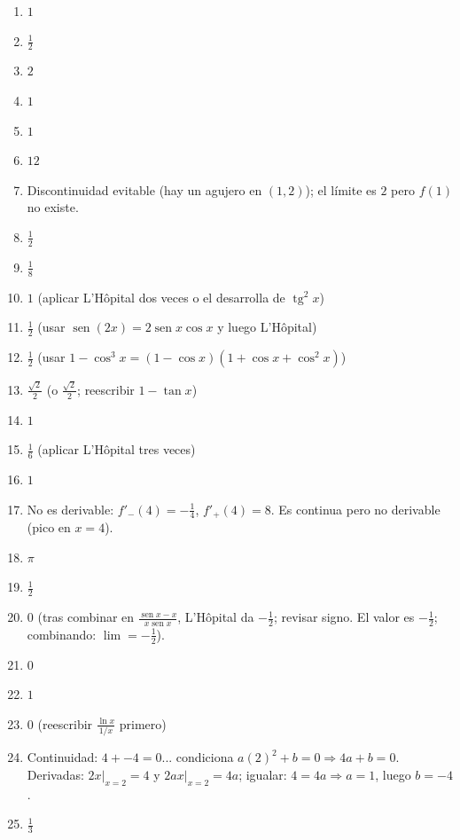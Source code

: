 \documentclass[12pt, letterpaper]{article}
\begin{document}
  \begin{enumerate}[leftmargin=*, label=\textbf{\arabic*.}]
    \item $1$
    \item $\frac{1}{2}$
    \item $2$
    \item $1$
    \item $1$
    \item $12$
    \item Discontinuidad evitable (hay un agujero en $(1,2)$); el límite es $2$ pero $f(1)$ no existe.
    \item $\frac{1}{2}$
    \item $\frac{1}{8}$
    \item $1$ (aplicar L'Hôpital dos veces o el desarrolla de $\operatorname{tg}^2 x$)
    \item $\frac{1}{2}$ (usar $\operatorname{sen}(2x) = 2\operatorname{sen}x\cos x$ y luego L'Hôpital)
    \item $\frac{1}{2}$ (usar $1-\cos^3 x = (1-\cos x)(1+\cos x+\cos^2 x)$)
    \item $\frac{\sqrt{2}}{2}$ (o $\frac{\sqrt{2}}{2}$; reescribir $1-\tan x$)
    \item $1$
    \item $\frac{1}{6}$ (aplicar L'Hôpital tres veces)
    \item $1$
    \item No es derivable: $f'_-(4) = -\frac{1}{4}$, $f'_+(4) = 8$. Es continua pero no derivable (pico en $x=4$).
    \item $\pi$ \checkmark
    \item $\frac{1}{2}$
    \item $0$ (tras combinar en $\frac{\operatorname{sen}x - x}{x\operatorname{sen}x}$, L'Hôpital da $-\frac{1}{2}$; revisar signo. El valor es $-\frac{1}{2}$; combinando: $\lim = -\frac{1}{2}$).
    \item $0$
    \item $1$
    \item $0$ (reescribir $\frac{\ln x}{1/x}$ primero)
    \item Continuidad: $4 + -4 = 0$... condiciona $a(2)^2 + b = 0 \Rightarrow 4a + b = 0$. Derivadas: $2x|_{x=2} = 4$ y $2ax|_{x=2} = 4a$; igualar: $4 = 4a \Rightarrow a = 1$, luego $b = -4$.
    \item $\frac{1}{3}$ \checkmark

  \end{enumerate}
\fi
\end{document}
